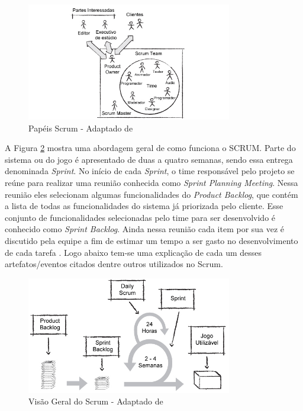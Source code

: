 \documentclass[quali]{ppgccufscar}
\begin{document}
\begin{figure}[!htbp]
	\begin{center}
	\caption{Papéis Scrum - Adaptado de }
	\label{fig_papeis}
	\includegraphics[width=0.8\textwidth,natwidth=598,natheight=342]{figura3.jpg}
	\end{center}
\end{figure}

A Figura \ref{fig_scrum} mostra uma abordagem geral de como funciona o SCRUM. Parte do sistema ou do jogo é apresentado de duas a quatro semanas, sendo essa entrega denominada \textit{Sprint}. No início de cada \textit{Sprint}, o time responsável pelo projeto se reúne para realizar uma reunião conhecida como \textit{Sprint Planning Meeting}. Nessa reunião eles selecionam algumas funcionalidades do \textit{Product Backlog}, que contém a lista de todas as funcionalidades do sistema já priorizada pelo cliente. Esse conjunto de funcionalidades selecionadas pelo time para ser desenvolvido é conhecido como \textit{Sprint Backlog}. Ainda nessa reunião cada item por sua vez é discutido pela equipe a fim de estimar um tempo a ser gasto no desenvolvimento de cada tarefa \cite{keith2010}. Logo abaixo tem-se uma explicação de cada um desses artefatos/eventos citados dentre outros utilizados no Scrum.

\begin{figure}[!htbp]
	\begin{center}
	\caption{Visão Geral do Scrum - Adaptado de }
	\label{fig_scrum}
	\includegraphics[width=0.8\textwidth,natwidth=598,natheight=342]{figura4.jpg}
	\end{center}
\end{figure}
\end{document}
